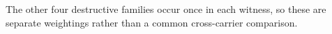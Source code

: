 The other four destructive families occur once in each witness, so these are separate weightings rather than a common cross-carrier comparison.
